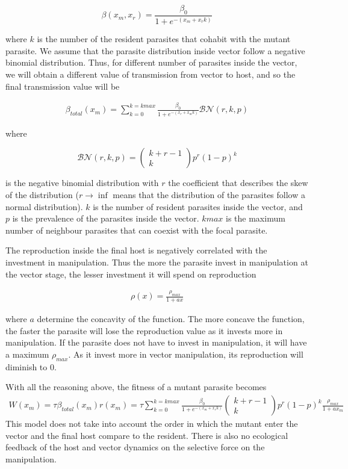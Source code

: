 \documentclass{article}
\begin{document}
$$\beta(x_m, x_r) = \frac{\beta_0}{1 + e^{-(x_m + x_r k)}}$$

where $k$ is the number of the resident parasites that cohabit with the mutant parasite. We assume that the parasite distribution inside vector follow a negative binomial distribution. Thus, for different number of parasites inside the vector, we will obtain a different value of transmission from vector to host, and so the final transmission value will be

\begin{align*}
    \beta_{total}(x_m) = \sum_{k = 0}^{k = kmax} \frac{\beta_0}{1 + e^{-(x_r + x_m  k)}} \mathcal{BN}(r, k, p)
\end{align*}

where 

$$\mathcal{BN}(r, k, p)
= \begin{pmatrix} k + r - 1 \\ k\end{pmatrix}p^r (1 -p)^k$$

is the negative binomial distribution with $r$ the coefficient that describes the skew of the distribution ($r \rightarrow \inf$ means that the distribution of the parasites follow a normal distribution). $k$ is the number of resident parasites inside the vector, and $p$ is the prevalence of the parasites inside the vector. $kmax$ is the maximum number of neighbour parasites that can coexist with the focal parasite.

The reproduction inside the final host is negatively correlated with the investment in manipulation. Thus the more the parasite invest in manipulation at the vector stage, the lesser investment it will spend on reproduction 

\begin{align*}
    \rho(x) = \frac{\rho_{max}}{1 + a x}
\end{align*}

where $a$ determine the concavity of the function. The more concave the function, the faster the parasite will lose the reproduction value as it invests more in manipulation. If the parasite does not have to invest in manipulation, it will have a maximum $\rho_{max}$. As it invest more in vector manipulation, its reproduction will diminish to 0.

With all the reasoning above, the fitness of a mutant parasite becomes
\begin{align*}
    W(x_m) = \tau \beta_{total}(x_m) r(x_m) = \tau \sum_{k = 0}^{k = kmax} \frac{\beta_0}{1 + e^{-(x_m + x_r  k)}} \begin{pmatrix} k + r - 1 \\ k\end{pmatrix}p^r (1 -p)^k  \frac{\rho_{max}}{1 + a x_m}
\end{align*}
This model does not take into account the order in which the mutant enter the vector and the final host compare to the resident. There is also no ecological feedback of the host and vector dynamics on the selective force on the manipulation.
\end{document}

